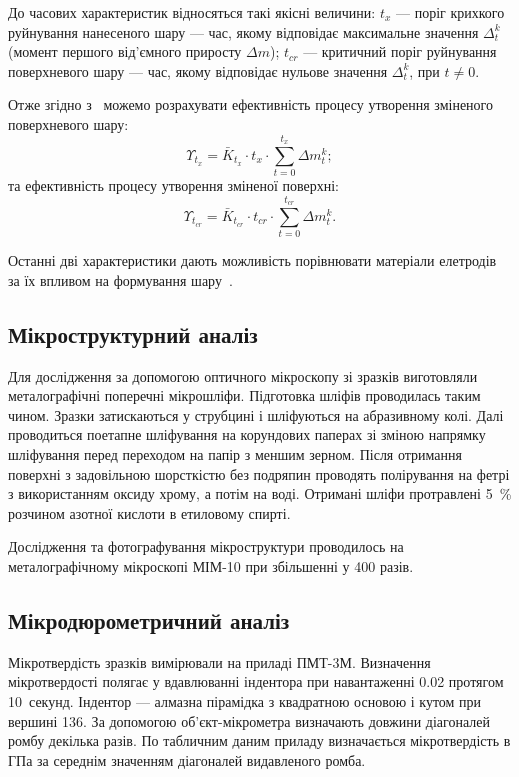 \documentclass[a4paper,fontsize=14bp,ukrainian]{extreport}
\begin{document}
До часових характеристик відносяться такі якісні величини: $t_x$ --- поріг крихкого руйнування нанесеного шару --- час, якому відповідає максимальне значення $\Delta_t^k$ (момент першого від'ємного приросту $\Delta m$); $t_{cr}$ --- критичний поріг руйнування поверхневого шару --- час, якому відповідає нульове значення $\Delta_t^k$, при $t \neq 0$.

Отже згідно з~\cite{mulin1999} можемо розрахувати ефективність процесу утворення зміненого поверхневого шару:
\begin{equation}
\Upsilon_{t_x} = \bar{K}_{t_x} \cdot t_x \cdot \sum_{t=0}^{t_x} \Delta m_t^k;
\label{eq:effectiveness_coef_x}
\end{equation}
та ефективність процесу утворення зміненої поверхні:
\begin{equation}
\Upsilon_{t_{cr}} = \bar{K}_{t_{cr}} \cdot t_{cr} \cdot \sum_{t=0}^{t_{cr}} \Delta m_t^k.
\label{eq:effectiveness_coef_cr}
\end{equation}

Останні дві характеристики дають можливість порівнювати матеріали елетродів за їх впливом на формування шару~\cite{yarkov2004}.

\subsection{Мікроструктурний аналіз}
\label{subsec:microstructure_analysis}

Для дослідження за допомогою оптичного мікроскопу зі зразків виготовляли металографічні поперечні мікрошліфи. Підготовка шліфів проводилась таким чином. Зразки затискаються у струбцині і шліфуються на абразивному колі. Далі проводиться поетапне шліфування на корундових паперах зі зміною напрямку шліфування перед переходом на папір з меншим зерном. Після отримання поверхні з задовільною шорсткістю без подряпин проводять полірування на фетрі з використанням оксиду хрому, а потім на воді. Отримані шліфи протравлені \SI{5}{\percent} розчином азотної кислоти в етиловому спирті.

Дослідження та фотографування мікроструктури проводилось на металографічному мікроскопі МІМ-10 при збільшенні у 400 разів.

\subsection{Мікродюрометричний аналіз}
\label{subsec:microhardness_analysis}

Мікротвердість зразків вимірювали на приладі ПМТ-3М. Визначення мікротвердості полягає у вдавлюванні індентора при навантаженні \SI{0.02}{\kilog} протягом 10~секунд. Індентор --- алмазна пірамідка з квадратною основою і кутом при вершині 136\degree. За допомогою об’єкт-мікрометра визначають довжини діагоналей ромбу декілька разів. По табличним даним приладу визначається мікротвердість в ГПа за середнім значенням діагоналей видавленого ромба.
\end{document}
